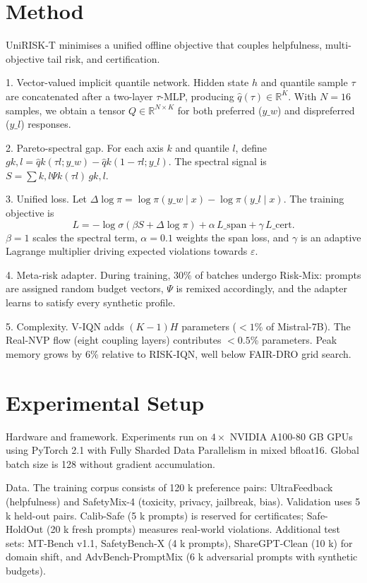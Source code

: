 \documentclass{article}
\begin{document}
\section{Method}
UniRISK-T minimises a unified offline objective that couples helpfulness, multi-objective tail risk, and certification.

1. Vector-valued implicit quantile network. Hidden state $h$ and quantile sample $\tau$ are concatenated after a two-layer $\tau$-MLP, producing $\hat{q}(\tau)\in\mathbb{R}^K$. With $N=16$ samples, we obtain a tensor $Q\in\mathbb{R}^{N\times K}$ for both preferred ($y\_w$) and dispreferred ($y\_l$) responses.

2. Pareto-spectral gap. For each axis $k$ and quantile $l$, define $g{k,l}=\hat{q}k(\taul; y\_w)-\hat{q}k(1-\taul; y\_l)$. The spectral signal is $S=\sum{k,l} \Psik(\taul)\, g{k,l}$.

3. Unified loss. Let $\Delta \log \pi=\log \pi(y\_w\mid x)-\log \pi(y\_l\mid x)$. The training objective is
\[L = -\log \sigma(\beta S + \Delta \log \pi) + \alpha \, L\_{\text{span}} + \gamma \, L\_{\text{cert}}.\]
$\beta=1$ scales the spectral term, $\alpha=0.1$ weights the span loss, and $\gamma$ is an adaptive Lagrange multiplier driving expected violations towards $\varepsilon$.

4. Meta-risk adapter. During training, 30\% of batches undergo Risk-Mix: prompts are assigned random budget vectors, $\Psi$ is remixed accordingly, and the adapter learns to satisfy every synthetic profile.

5. Complexity. V-IQN adds $(K-1)H$ parameters ($<1$\% of Mistral-7B). The Real-NVP flow (eight coupling layers) contributes $<0.5$\% parameters. Peak memory grows by 6\% relative to RISK-IQN, well below FAIR-DRO grid search.

\section{Experimental Setup}
Hardware and framework. Experiments run on $4 \times$ NVIDIA A100-80 GB GPUs using PyTorch 2.1 with Fully Sharded Data Parallelism in mixed bfloat16. Global batch size is 128 without gradient accumulation.

Data. The training corpus consists of 120 k preference pairs: UltraFeedback (helpfulness) and SafetyMix-4 (toxicity, privacy, jailbreak, bias). Validation uses 5 k held-out pairs. Calib-Safe (5 k prompts) is reserved for certificates; Safe-HoldOut (20 k fresh prompts) measures real-world violations. Additional test sets: MT-Bench v1.1, SafetyBench-X (4 k prompts), ShareGPT-Clean (10 k) for domain shift, and AdvBench-PromptMix (6 k adversarial prompts with synthetic budgets).
\end{document}
